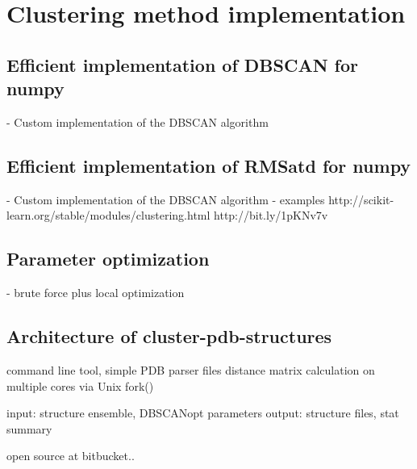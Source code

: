 \section{Clustering method implementation}

\subsection{Efficient implementation of DBSCAN for numpy}

        - Custom implementation of the DBSCAN algorithm

\subsection{Efficient implementation of RMSatd for numpy}

        - Custom implementation of the DBSCAN algorithm
        - examples
            http://scikit-learn.org/stable/modules/clustering.html
            http://bit.ly/1pKNv7v


\subsection{Parameter optimization}

        - brute force plus local optimization

\subsection{Architecture of cluster-pdb-structures}

            command line tool, simple PDB parser files
            distance matrix calculation on multiple cores via Unix fork()

            input: structure ensemble, DBSCANopt parameters
            output: structure files, stat summary


            open source at bitbucket..


